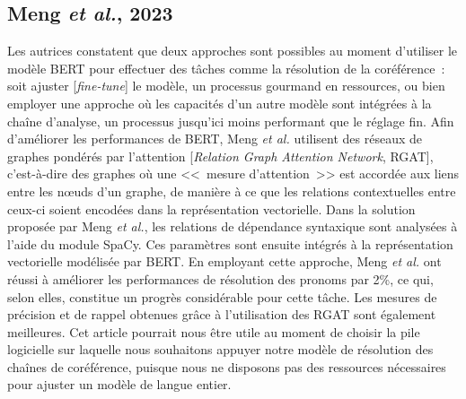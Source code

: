 \documentclass[hidelinks, 11pt, letterpaper]{article}
\newcommand{\guil}[1]{<<~{#1}~>>} %
\begin{document}
\subsection*{Meng \emph{et al.}, 2023}
Les autrices constatent que deux approches sont possibles au moment d'utiliser le modèle BERT pour effectuer des tâches comme la résolution de la coréférence~: soit ajuster [\emph{fine-tune}] le modèle, un processus gourmand en ressources, ou bien employer une approche où les capacités d'un autre modèle sont intégrées à la chaîne d'analyse, un processus jusqu'ici moins performant que le réglage fin.
Afin d'améliorer les performances de BERT, Meng \emph{et al.} utilisent des réseaux de graphes pondérés par l'attention [\emph{Relation Graph Attention Network}, RGAT], c'est-à-dire des graphes où une \guil{mesure d'attention} est accordée aux liens entre les n\oe uds d'un graphe, de manière à ce que les relations contextuelles entre ceux-ci soient encodées dans la représentation vectorielle.
Dans la solution proposée par Meng \emph{et al.}, les relations de dépendance syntaxique sont analysées à l'aide du module SpaCy.
Ces paramètres sont ensuite intégrés à la représentation vectorielle modélisée par BERT.
En employant cette approche, Meng \emph{et al.} ont réussi à améliorer les performances de résolution des pronoms par 2\%, ce qui, selon elles, constitue un progrès considérable pour cette tâche.
Les mesures de précision et de rappel obtenues grâce à l'utilisation des RGAT sont également meilleures.
Cet article pourrait nous être utile au moment de choisir la pile logicielle sur laquelle nous souhaitons appuyer notre modèle de résolution des chaînes de coréférence, puisque nous ne disposons pas des ressources nécessaires pour ajuster un modèle de langue entier.
\end{document}
